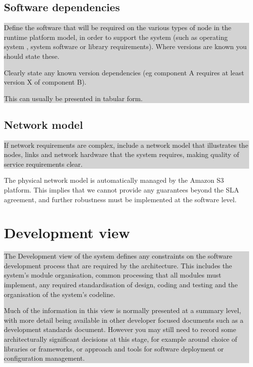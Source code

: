 \documentclass[a4paper,11pt]{report}
\newcommand{\instructions}[1]{
  \noindent\colorbox{lightgray}{%
    \parbox{\linewidth}{%
      #1
    }%
  }%
 \vspace{0.1cm}
}
\begin{document}
\subsection{Software dependencies}
\label{sec:softw-depend}

\instructions{
Define the software that will be required on the various types of node
in the runtime platform model, in order to support the system (such as
operating system , system software or library requirements). Where
versions are known you should state these.

Clearly state any known version dependencies (eg component A requires
at least version X of component B).

This can usually be presented in tabular form.
}

\subsection{Network model}
\label{sec:network-model}

\instructions{
If network requirements are complex, include a network model that
illustrates the nodes, links and network hardware that the system
requires, making quality of service requirements clear.
}

The physical network model is automatically managed by the Amazon S3
platform.  This implies that we cannot provide any guarantees beyond
the SLA agreement, and further robustness must be implemented at the
software level.

\section{Development view}
\label{sec:development-view}

\instructions{
The Development view of the system defines any constraints on the
software development process that are required by the
architecture. This includes the system’s module organisation, common
processing that all modules must implement, any required
standardisation of design, coding and testing and the organisation of
the system’s codeline.

Much of the information in this view is normally presented at a
summary level, with more detail being available in other developer
focused documents such as a development standards document. However
you may still need to record some architecturally significant
decisions at this stage, for example around choice of libraries or
frameworks, or approach and tools for software deployment or
configuration management.
}
\end{document}
